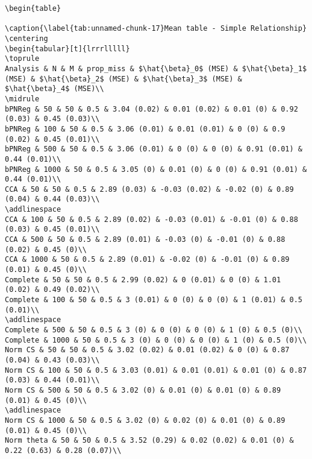 \documentclass[
]{article}
\begin{document}
\begin{verbatim}
\begin{table}

\caption{\label{tab:unnamed-chunk-17}Mean table - Simple Relationship}
\centering
\begin{tabular}[t]{lrrrlllll}
\toprule
Analysis & N & M & prop_miss & $\hat{\beta}_0$ (MSE) & $\hat{\beta}_1$ (MSE) & $\hat{\beta}_2$ (MSE) & $\hat{\beta}_3$ (MSE) & $\hat{\beta}_4$ (MSE)\\
\midrule
bPNReg & 50 & 50 & 0.5 & 3.04 (0.02) & 0.01 (0.02) & 0.01 (0) & 0.92 (0.03) & 0.45 (0.03)\\
bPNReg & 100 & 50 & 0.5 & 3.06 (0.01) & 0.01 (0.01) & 0 (0) & 0.9 (0.02) & 0.45 (0.01)\\
bPNReg & 500 & 50 & 0.5 & 3.06 (0.01) & 0 (0) & 0 (0) & 0.91 (0.01) & 0.44 (0.01)\\
bPNReg & 1000 & 50 & 0.5 & 3.05 (0) & 0.01 (0) & 0 (0) & 0.91 (0.01) & 0.44 (0.01)\\
CCA & 50 & 50 & 0.5 & 2.89 (0.03) & -0.03 (0.02) & -0.02 (0) & 0.89 (0.04) & 0.44 (0.03)\\
\addlinespace
CCA & 100 & 50 & 0.5 & 2.89 (0.02) & -0.03 (0.01) & -0.01 (0) & 0.88 (0.03) & 0.45 (0.01)\\
CCA & 500 & 50 & 0.5 & 2.89 (0.01) & -0.03 (0) & -0.01 (0) & 0.88 (0.02) & 0.45 (0)\\
CCA & 1000 & 50 & 0.5 & 2.89 (0.01) & -0.02 (0) & -0.01 (0) & 0.89 (0.01) & 0.45 (0)\\
Complete & 50 & 50 & 0.5 & 2.99 (0.02) & 0 (0.01) & 0 (0) & 1.01 (0.02) & 0.49 (0.02)\\
Complete & 100 & 50 & 0.5 & 3 (0.01) & 0 (0) & 0 (0) & 1 (0.01) & 0.5 (0.01)\\
\addlinespace
Complete & 500 & 50 & 0.5 & 3 (0) & 0 (0) & 0 (0) & 1 (0) & 0.5 (0)\\
Complete & 1000 & 50 & 0.5 & 3 (0) & 0 (0) & 0 (0) & 1 (0) & 0.5 (0)\\
Norm CS & 50 & 50 & 0.5 & 3.02 (0.02) & 0.01 (0.02) & 0 (0) & 0.87 (0.04) & 0.43 (0.03)\\
Norm CS & 100 & 50 & 0.5 & 3.03 (0.01) & 0.01 (0.01) & 0.01 (0) & 0.87 (0.03) & 0.44 (0.01)\\
Norm CS & 500 & 50 & 0.5 & 3.02 (0) & 0.01 (0) & 0.01 (0) & 0.89 (0.01) & 0.45 (0)\\
\addlinespace
Norm CS & 1000 & 50 & 0.5 & 3.02 (0) & 0.02 (0) & 0.01 (0) & 0.89 (0.01) & 0.45 (0)\\
Norm theta & 50 & 50 & 0.5 & 3.52 (0.29) & 0.02 (0.02) & 0.01 (0) & 0.22 (0.63) & 0.28 (0.07)\\

\end{verbatim}
\end{document}
